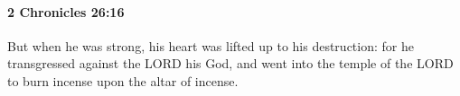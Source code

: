 
		\paragraph{2 Chronicles 26:16} %
			\label{2CHRONICLES-26-16}

			But when he was strong, his heart was lifted up to his destruction: for he transgressed against the LORD his God, and went into the temple of the LORD to burn incense upon the altar of incense.


